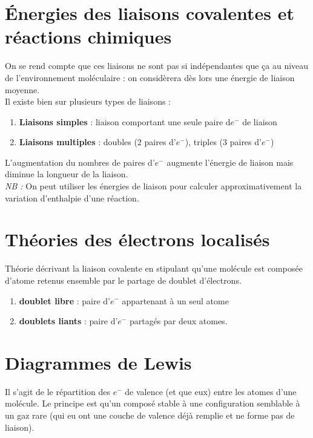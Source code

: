 \documentclass[british,french,11pt, a4paper, openany]{book}
\begin{document}
\section{Énergies des liaisons covalentes et réactions chimiques}
On se rend compte que ces liaisons ne sont pas si indépendantes que ça au niveau de l'environnement moléculaire : on considèrera dès lors une énergie de liaison moyenne.\\
Il existe bien sur plusieurs types de liaisons : 
\begin{enumerate}
	\item \textbf{Liaisons simples} : liaison comportant une seule paire d$e^-$ de liaison
	\item \textbf{Liaisons multiples} : doubles (2 paires d'$e^-$), triples (3 paires d'$e^-$)
\end{enumerate}
L'augmentation du nombres de paires d'$e^-$ augmente l'énergie de liaison mais diminue la longueur de la liaison.\\
\textit{NB : } On peut utiliser les énergies de liaison pour calculer approximativement la variation d'enthalpie d'une réaction.

\section{Théories des électrons localisés}
Théorie décrivant la liaison covalente en stipulant qu'une molécule est composée d'atome retenus ensemble par le partage de doublet d'électrons. 
\begin{enumerate}
	\item \textbf{doublet libre} : paire d'$e^-$ appartenant à un seul atome
	\item \textbf{doublets liants} : paire d'$e^-$ partagés par deux atomes.
\end{enumerate}

\section{Diagrammes de Lewis}
Il s'agit de le répartition des $e^-$ de valence (et que eux) entre les atomes d'une molécule. Le principe est qu'un composé stable à une configuration semblable à un gaz rare (qui eu ont une couche de valence déjà remplie et ne forme pas de liaison).\\
\end{document}

